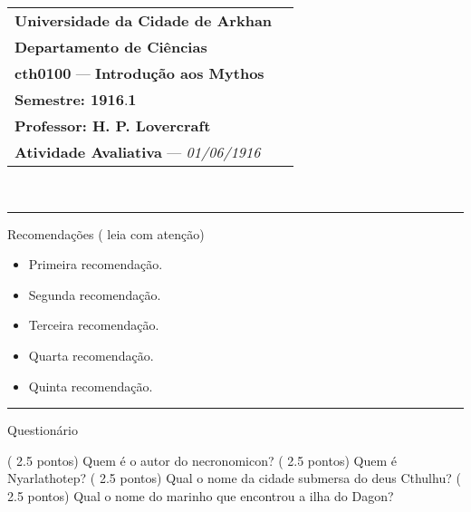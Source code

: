 \documentclass[12pt]{exam}
\newcommand{\university}[1]{\textbf{#1}}
\newcommand{\colleage}[1]{\textbf{#1}}
\newcommand{\course}[2]{\textbf{#1} --- \textbf{#2}}
\newcommand{\period}[2]{\textbf{Semestre: #1}.\textbf{#2}}
\newcommand{\teacher}[1]{\textbf{Professor: #1}}
\newcommand{\examdate}[3]{\textit{#1/#2/#3}}
\begin{document}
	\pagestyle{plain}
	\thispagestyle{empty}
	\noindent
	\begin{tabular*}{\textwidth}{ll}
		\university{Universidade da Cidade de Arkhan}\\
		\colleage{Departamento de Ciências}\\
		\course{cth0100}{Introdução aos Mythos}\\
		\period{1916}{1}\\
		\teacher{H. P. Lovercraft}\\
		\textbf{Atividade Avaliativa} --- \examdate{01}{06}{1916}\\
	\end{tabular*}\\
	\rule[0.1ex]{\textwidth}{1pt}
	\begin{center}
		Recomendações ({\color{red} leia com atenção})
	\end{center}
	\begin{itemize}
		\item Primeira recomendação.
		\item Segunda recomendação.
		\item Terceira recomendação.
		\item Quarta recomendação.
		\item Quinta recomendação.
	\end{itemize}
	\rule[0.1ex]{\textwidth}{1pt}
	\begin{center}
		{\LARGE Questionário}
	\end{center}
	\begin{questions}
		\question ({\color{blue} 2.5 pontos}) Quem é o autor do necronomicon?
		\question ({\color{blue} 2.5 pontos}) Quem é Nyarlathotep?
		\question ({\color{blue} 2.5 pontos}) Qual o nome da cidade submersa do deus Cthulhu?
		\question ({\color{blue} 2.5 pontos}) Qual o nome do marinho que encontrou a ilha do Dagon?
	\end{questions}
\end{document}
